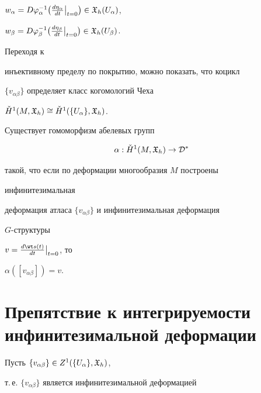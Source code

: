 $ w_{\alpha}=D \varphi_{\alpha}^{-1}


\big(\frac{d\eta_{\alpha}}{dt} \big|_{t=0}


\big)\in {\frak X}_h(U_{\alpha})$,


$w_{\beta}=D \varphi_{\beta}^{-1}


\big(\frac{d\eta_{\beta}}{dt} \big|_{t=0}


\big)\in {\frak X}_h(U_{\beta})$.





Переходя к


инъективному пределу по покрытию, можно показать, что коцикл


$\{v_{\alpha \beta}\}$ определяет класс когомологий Чеха


$\Check H^1(M,{\frak X}_h)\cong \Check H^1(\{U_{\alpha}\},


{\frak X}_h)$.





\begin{assrt}


Существует гомоморфизм абелевых групп


$$


\alpha : \Check H^1(M,{\frak X}_h) \to {\cal D^{\ast}}


$$


такой, что если по деформации многообразия $M$ построены 


инфинитезимальная


деформация атласа $\{v_{\alpha \beta}\}$ и инфинитезимальная деформация


$G$-структуры 


$v=\frac{d\wt s(t)}{dt}\big|_{t=0}$, то


$\alpha ([v_{\alpha\beta}])=v.$


\end{assrt}





\section{Препятствие к интегрируемости инфинитезимальной деформации}





Пусть $\{v_{\alpha \beta}\}\in Z^1(\{U_{\alpha}\},{\frak X}_h)$,


т.\,е. $\{v_{\alpha \beta}\}$ является инфинитезимальной деформацией


